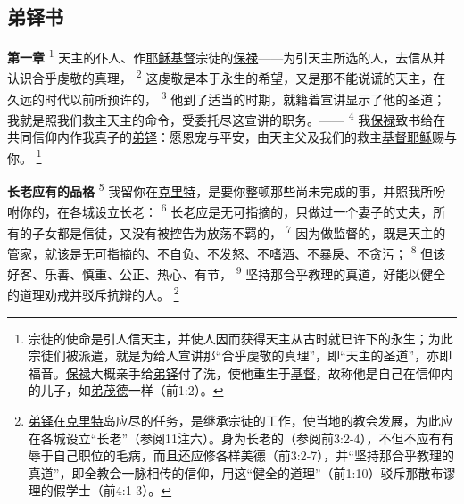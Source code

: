 \setlength\columnsep{0.6cm}
\begin{multicols}{2}

\chapter*{弟铎书}


\textbf{第一章\quad}
\textsuperscript{1}
天主的仆人、作\uline{耶稣}\uline{基督}宗徒的\uline{保禄}——为引天主所选的人，去信从并认识合乎虔敬的真理，
\textsuperscript{2}
这虔敬是本于永生的希望，又是那不能说谎的天主，在久远的时代以前所预许的，
\textsuperscript{3}
他到了适当的时期，就籍着宣讲显示了他的圣道；我就是照我们救主天主的命令，受委托尽这宣讲的职务。——
\textsuperscript{4}
我\uline{保禄}致书给在共同信仰内作我真子的\uline{弟铎}：愿恩宠与平安，由天主父及我们的救主\uline{基督}\uline{耶稣}赐与你。
\renewcommand\thefootnote{\ding{\numexpr171+\value{footnote}}}
\footnote{宗徒的使命是引人信天主，并使人因而获得天主从古时就已许下的永生；为此宗徒们被派遣，就是为给人宣讲那“合乎虔敬的真理”，即“天主的圣道”，亦即福音。\uline{保禄}大概亲手给\uline{弟铎}付了洗，使他重生于\uline{基督}，故称他是自己在信仰内的儿子，如\uline{弟茂德}一样（前1:2）。}

\textbf{长老应有的品格\quad}
\textsuperscript{5}
我留你在\uline{克里特}，是要你整顿那些尚未完成的事，并照我所吩咐你的，在各城设立长老：
\textsuperscript{6}
长老应是无可指摘的，只做过一个妻子的丈夫，所有的子女都是信徒，又没有被控告为放荡不羁的，
\textsuperscript{7}
因为做监督的，既是天主的管家，就该是无可指摘的、不自负、不发怒、不嗜酒、不暴戾、不贪污；
\textsuperscript{8}
但该好客、乐善、慎重、公正、热心、有节，
\textsuperscript{9}
坚持那合乎教理的真道，好能以健全的道理劝戒并驳斥抗辩的人。
\footnote{\uline{弟铎}在\uline{克里特}岛应尽的任务，是继承宗徒的工作，使当地的教会发展，为此应在各城设立“长老”（参阅11注六）。身为长老的（参阅前3:2-4），不但不应有有辱于自己职位的毛病，而且还应修各样美德（前3:2-7），并“坚持那合乎教理的真道”，即全教会一脉相传的信仰，用这“健全的道理”（前1:10）驳斥那散布谬理的假学士（前4:1-3）。}


\end{multicols}
